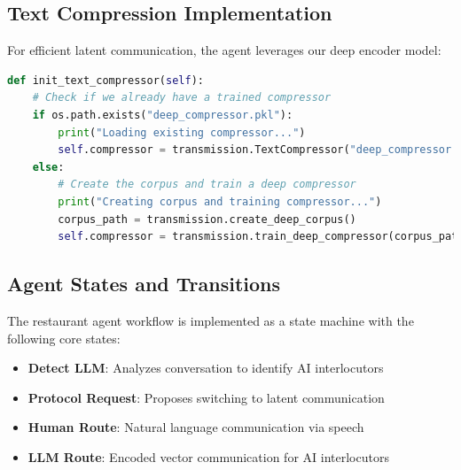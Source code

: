 \documentclass[12pt,openany]{article}
\theoremstyle{definition}
\theoremstyle{definition}
\theoremstyle{definition}
\begin{document}
\subsection*{Text Compression Implementation}
For efficient latent communication, the agent leverages our deep encoder model:

\begin{lstlisting}[language=Python, caption=Text Compressor Initialization]
def init_text_compressor(self):
    # Check if we already have a trained compressor
    if os.path.exists("deep_compressor.pkl"):
        print("Loading existing compressor...")
        self.compressor = transmission.TextCompressor("deep_compressor.pkl")
    else:
        # Create the corpus and train a deep compressor
        print("Creating corpus and training compressor...")
        corpus_path = transmission.create_deep_corpus()
        self.compressor = transmission.train_deep_compressor(corpus_path)
\end{lstlisting}

\subsection*{Agent States and Transitions}
The restaurant agent workflow is implemented as a state machine with the following core states:

\begin{itemize}
    \item \textbf{Detect LLM}: Analyzes conversation to identify AI interlocutors
    \item \textbf{Protocol Request}: Proposes switching to latent communication
    \item \textbf{Human Route}: Natural language communication via speech
    \item \textbf{LLM Route}: Encoded vector communication for AI interlocutors
\end{itemize}
\end{document}
